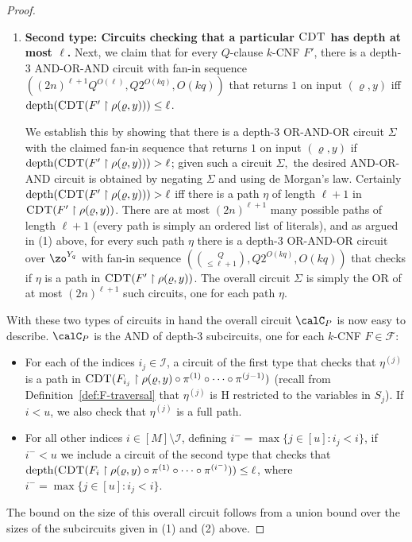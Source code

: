 \documentclass{toc}
\theoremstyle{plain}
\newcommand{\uhr}{\upharpoonright}
\newcommand{\CDT}{\textsc{CDT}}
\newcommand{\depth}{\mathrm{depth}}
\begin{document}
\begin{proof}
\begin{enumerate}
\item {\bf Second type: Circuits checking that a particular $\CDT$ has depth at most $\ell$.} Next, we claim that for every $Q$-clause $k$-CNF $F'$, there is a depth-3 AND-OR-AND circuit with fan-in sequence $((2n)^{\ell+1}Q^{O(\ell)}, Q2^{O(kq)}, O(kq))$ that returns $1$ on input $(\varrho,y)$ iff $\depth(\CDT(F' \uhr \rho(\varrho,y))) \le \ell$. 

We establish this by showing that there is a depth-$3$ OR-AND-OR circuit $\Sigma$ with the claimed fan-in sequence that returns $1$ on input $(\varrho,y)$ if $\depth(\CDT(F' \uhr\rho(\varrho,y))) > \ell$; given such a circuit $\Sigma,$ the desired AND-OR-AND circuit is obtained by negating $\Sigma$ and using de Morgan's law. Certainly $\depth(\CDT(F'\uhr \rho(\varrho,y))) > \ell$ iff there is a path $\eta$ of length $\ell+1$ in $\CDT(F' \uhr\rho(\varrho,y))$.  There are at most $(2n)^{\ell+1}$ many possible paths of length $\ell+1$ (every path is simply an ordered list of literals), and as argued in (1) above, for every such path $\eta$ there is a depth-$3$ OR-AND-OR circuit over $\zo^{Y_q}$ with fan-in sequence $({Q\choose \le \ell+1}, Q2^{O(kq)},O(kq))$  that checks if $\eta$ is a path in $\CDT(F'\uhr \rho(\varrho,y))$.  The overall circuit $\Sigma$ is simply the OR of at most $(2n)^{\ell+1}$ such circuits, one for each path $\eta$. 
\end{enumerate} 



With these two types of circuits in hand the overall circuit $\calC_P$ is now easy to describe. $\calC_P$ is the AND of
%
depth-$3$ subcircuits, one for each $k$-CNF $F \in \mathscr{F}$: 
\begin{itemize}
\item For each of the
%
indices $i_j \in \mathscr{I}$, a circuit of the first type that checks that $\eta^{(j)}$ is a path in $\CDT(F_{i_j} \uhr \rho(\varrho,y) \circ \pi^{(1)} \circ \cdots \circ \pi^{(j-1)})$ (recall from Definition~\ref{def:F-traversal} that $\eta^{(j)}$ is ${\mathrm{H}}$ restricted to the variables in $S_j$).  If $i < u$, we also check that $\eta^{(j)}$ is a full path. 
\item For all
%
other indices $i \in [M] \setminus \mathscr{I}$, defining $i^{-} = \max \{ j \in [u] \colon i_j < i\}$, if $i^{-} < u$ we include a circuit of the second type that checks that $\depth(\CDT(F_i \uhr \rho(\varrho,y) \circ \pi^{(1)}\circ \cdots\circ\pi^{(i^{-})})) \le \ell$, where $i^{-} = \max \{ j \in [u] \colon i_j < i\}$.    
\end{itemize} 
The bound on the size of this overall circuit follows from a union bound over the sizes of the subcircuits given in (1) and (2) above. 
\end{proof} 
\end{document}
